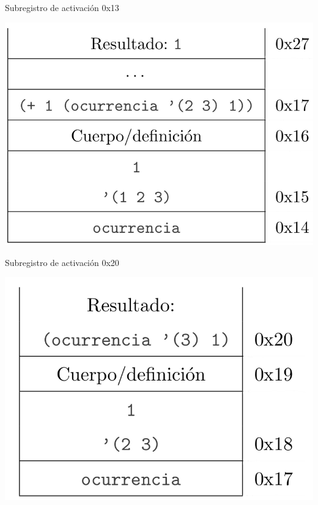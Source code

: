 
\begin{multicols}{2}
Subregistro de activación 0x13
\begin{center}
        \includegraphics[scale=0.25]{./R2}
\end{center}

Subregistro de activación 0x20
\begin{center}
        \includegraphics[scale=0.25]{./R3}
\end{center}


\end{multicols}
